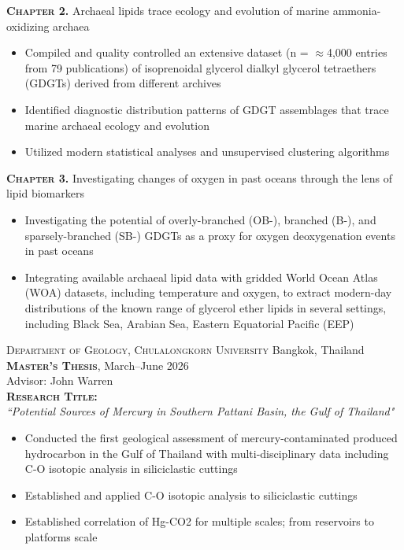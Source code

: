 \documentclass[10pt]{article}
\begin{document}
\bigskip
\textbf{\textsc{Chapter 2.}} Archaeal lipids trace ecology and evolution of marine ammonia-oxidizing archaea
\begin{itemize}[leftmargin=*]
    \item Compiled and quality controlled an extensive dataset (n = $\approx$4,000 entries from 79 publications) of isoprenoidal glycerol dialkyl glycerol tetraethers (GDGTs) derived from different archives
    \item Identified diagnostic distribution patterns of GDGT assemblages that trace marine archaeal ecology and evolution
    \item Utilized modern statistical analyses and unsupervised clustering algorithms
\end{itemize}    


\textbf{\textsc{Chapter 3.}} Investigating changes of oxygen in past oceans through the lens of lipid biomarkers
\begin{itemize}[leftmargin=*]
    \item Investigating the potential of overly-branched (OB-), branched (B-), and sparsely-branched (SB-) GDGTs as a proxy for oxygen deoxygenation events in past oceans
    \item Integrating available archaeal lipid data with gridded World Ocean Atlas (WOA) datasets, including temperature and oxygen, to extract modern-day distributions of the known range of glycerol ether lipids in several settings, including Black Sea, Arabian Sea, Eastern Equatorial Pacific (EEP)
\end{itemize}  

\bigskip
\textsc{Department of Geology, Chulalongkorn University} \hfill Bangkok, Thailand \\
\textsc{\textbf{Master's Thesis}}, March--June 2026 \\
Advisor: John Warren \\

\textbf{\textsc{Research Title:}} \\
\textit{``Potential Sources of Mercury in Southern Pattani Basin, the Gulf of Thailand"} 

\begin{itemize}[leftmargin=*]
    \item Conducted the first geological assessment of mercury-contaminated produced hydrocarbon in the Gulf of Thailand with multi-disciplinary data including C-O isotopic analysis in siliciclastic cuttings
    \item Established and applied C-O isotopic analysis to siliciclastic cuttings
    \item Established correlation of Hg-CO2 for multiple scales; from reservoirs to platforms scale
\end{itemize}  
\end{document}
